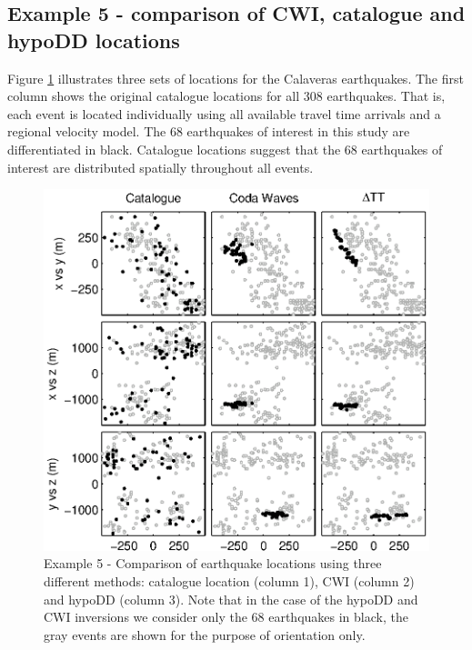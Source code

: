 \documentclass[extra]{gji}
\begin{document}
\subsection{Example 5 - comparison of CWI, catalogue and hypoDD locations}

Figure \ref{fig-69Calaverasevents_eg1} illustrates three sets of
locations for the Calaveras earthquakes. The first column shows the
original catalogue locations for all 308 earthquakes. That is, each event
is located individually using all available travel time arrivals and
a regional velocity model. The 68 earthquakes of interest in this
study are differentiated in black. Catalogue locations suggest that
the 68 earthquakes of interest are distributed spatially throughout
all events.


\begin{figure}
\includegraphics{diags/CalaverasLoc1_hypoDD_SVD.eps}
\caption{Example 5 - Comparison of earthquake locations using three
different methods: catalogue location (column 1), CWI (column 2) and
hypoDD (column 3). Note that in the case of the hypoDD and CWI
inversions we consider only the 68 earthquakes in black, the gray
events are shown for the purpose of orientation only.}
\label{fig-69Calaverasevents_eg1}
\end{figure}
\end{document}
